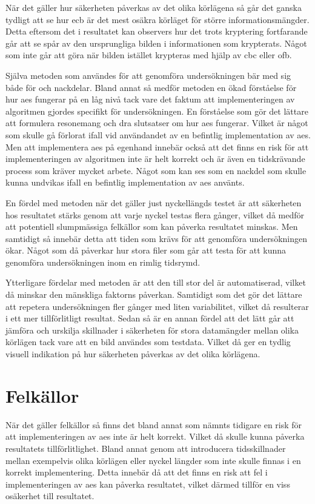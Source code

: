 När det gäller hur säkerheten påverkas av det olika körlägena så går det ganska tydligt att se hur \acrshort{ecb} är det mest osäkra körläget för större informationsmängder.
Detta eftersom det i resultatet kan observers hur det trots kryptering fortfarande går att se spår av den ursprungliga bilden i informationen som krypterats. Något som inte
går att göra när bilden istället krypteras med hjälp av \acrshort{cbc} eller \acrshort{ofb}.

Själva metoden som användes för att genomföra undersökningen bär med sig både för och nackdelar. Bland annat så medför metoden en ökad förståelse för hur \acrfull{aes} fungerar
på en låg nivå tack vare det faktum att implementeringen av algoritmen gjordes specifikt för undersökningen. En förståelse som gör det lättare att formulera resonemang och
dra slutsatser om hur \acrshort{aes} fungerar. Vilket är något som skulle gå förlorat ifall vid användandet av en befintlig implementation av \acrshort{aes}. Men att implementera
\acrshort{aes} på egenhand innebär också att det finns en risk för att implementeringen av algoritmen inte är helt korrekt och är även en tidskrävande process som kräver
mycket arbete. Något som kan ses som en nackdel som skulle kunna undvikas ifall en befintlig implementation av \acrshort{aes} använts.

En fördel med metoden när det gäller just nyckellängds testet är att säkerheten hos resultatet stärks genom att varje nyckel testas flera gånger, vilket då medför att
potentiell slumpmässiga felkällor som kan påverka resultatet minskas. Men samtidigt så innebär detta att tiden som krävs för att genomföra undersökningen ökar. Något som
då påverkar hur stora filer som går att testa för att kunna genomföra undersökningen inom en rimlig tidsrymd.

Ytterligare fördelar med metoden är att den till stor del är automatiserad, vilket då minskar den mänskliga faktorns påverkan. Samtidigt som det gör det lättare att
repetera undersökningen fler gånger med liten variabilitet, vilket då resulterar i ett mer tillförlitligt resultat. Sedan så är
en annan fördel att det lätt går att jämföra och urskilja skillnader i säkerheten för stora datamängder mellan olika körlägen tack vare att en bild användes som testdata.
Vilket då ger en tydlig visuell indikation på hur säkerheten påverkas av det olika körlägena.

\section{Felkällor} %
\label{sec:errors}
När det gäller felkällor så finns det bland annat som nämnts tidigare en risk för att implementeringen av \acrshort{aes} inte är helt korrekt. Vilket
då skulle kunna påverka resultatets tillförlitlighet. Bland annat genom att introducera tidsskillnader mellan exempelvis olika körlägen eller nyckel längder som inte skulle finnas i en korrekt implementering. Detta innebär
då att det finns en risk att fel i implementeringen av \acrshort{aes} kan påverka resultatet, vilket därmed tillför en viss osäkerhet till resultatet. %

